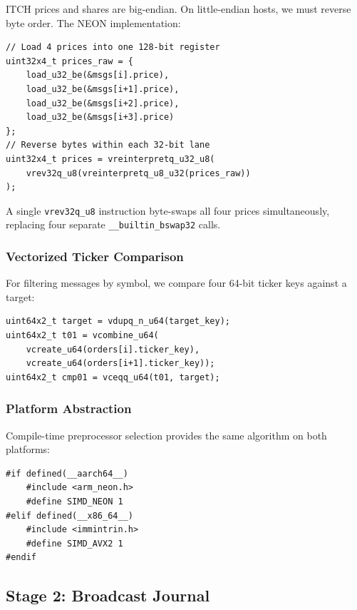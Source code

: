 \documentclass[conference]{IEEEtran}
\begin{document}
ITCH prices and shares are big-endian. On little-endian hosts, we must reverse byte order. The NEON implementation:

\begin{lstlisting}[style=cppstyle, caption={4-wide byte-swap using ARM NEON}]
// Load 4 prices into one 128-bit register
uint32x4_t prices_raw = {
    load_u32_be(&msgs[i].price),
    load_u32_be(&msgs[i+1].price),
    load_u32_be(&msgs[i+2].price),
    load_u32_be(&msgs[i+3].price)
};
// Reverse bytes within each 32-bit lane
uint32x4_t prices = vreinterpretq_u32_u8(
    vrev32q_u8(vreinterpretq_u8_u32(prices_raw))
);
\end{lstlisting}

A single \texttt{vrev32q\_u8} instruction byte-swaps all four prices simultaneously, replacing four separate \texttt{\_\_builtin\_bswap32} calls.

\subsubsection{Vectorized Ticker Comparison}

For filtering messages by symbol, we compare four 64-bit ticker keys against a target:

\begin{lstlisting}[style=cppstyle, caption={4-wide ticker filter using NEON}]
uint64x2_t target = vdupq_n_u64(target_key);
uint64x2_t t01 = vcombine_u64(
    vcreate_u64(orders[i].ticker_key),
    vcreate_u64(orders[i+1].ticker_key));
uint64x2_t cmp01 = vceqq_u64(t01, target);
\end{lstlisting}

\subsubsection{Platform Abstraction}

Compile-time preprocessor selection provides the same algorithm on both platforms:

\begin{lstlisting}[style=cppstyle, caption={Platform detection}]
#if defined(__aarch64__)
    #include <arm_neon.h>
    #define SIMD_NEON 1
#elif defined(__x86_64__)
    #include <immintrin.h>
    #define SIMD_AVX2 1
#endif
\end{lstlisting}

\subsection{Stage 2: Broadcast Journal}
\end{document}
